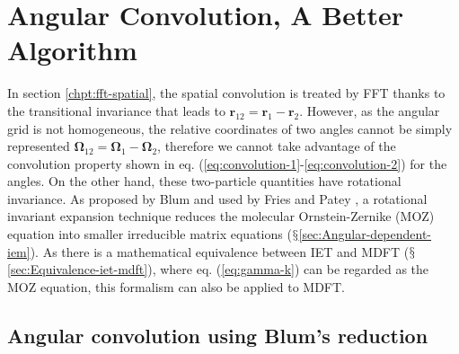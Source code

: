 
\chapter{Angular Convolution, A Better Algorithm\label{chpt:angular-convolution}}

In section \ref{chpt:fft-spatial}, the spatial convolution is treated
by \acs{FFT} thanks to the transitional invariance that leads to
$\mathbf{r}_{12}=\mathbf{r}_{1}-\mathbf{r}_{2}$. However, as the
angular grid is not homogeneous, the relative coordinates of two angles
cannot be simply represented $\mathbf{\Omega}_{12}=\mathbf{\Omega}_{1}-\mathbf{\Omega}_{2}$,
therefore we cannot take advantage of the convolution property shown
in eq. (\ref{eq:convolution-1}-\ref{eq:convolution-2}) for the angles.
On the other hand, these two-particle quantities have rotational invariance.
As proposed by Blum \citep{Blum_I,Blum_II} and used by Fries and
Patey \citep{Fries_Patey_1985}, a rotational invariant expansion
technique reduces the molecular Ornstein-Zernike (\acs{MOZ}) equation
into smaller irreducible matrix equations ($\mathsection$\ref{sec:Angular-dependent-iem}).
As there is a mathematical equivalence between \acs{IET} and \acs{MDFT}
($\mathsection$\ref{sec:Equivalence-iet-mdft}), where eq. (\ref{eq:gamma-k})
can be regarded as the \acs{MOZ} equation, this formalism can also
be applied to \acs{MDFT}.

\section{Angular convolution using Blum's reduction}

